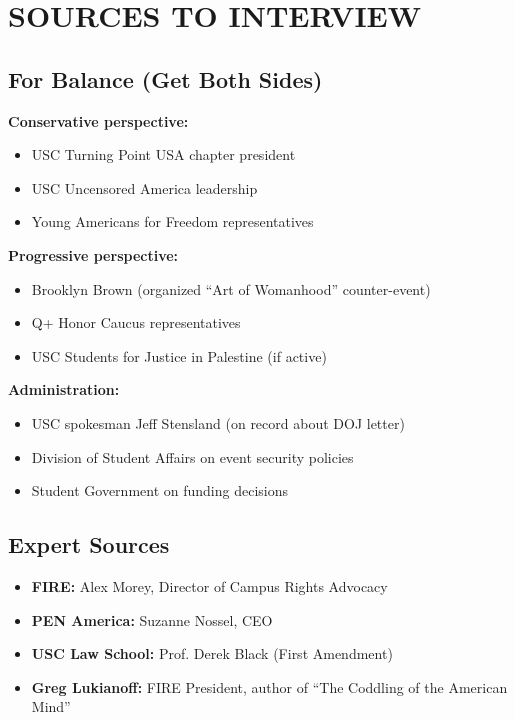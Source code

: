 \documentclass[11pt,letterpaper]{article}
\begin{document}
\section{SOURCES TO INTERVIEW}

\subsection{For Balance (Get Both Sides)}

\textbf{Conservative perspective:}
\begin{itemize}[noitemsep]
    \item USC Turning Point USA chapter president
    \item USC Uncensored America leadership
    \item Young Americans for Freedom representatives
\end{itemize}

\textbf{Progressive perspective:}
\begin{itemize}[noitemsep]
    \item Brooklyn Brown (organized ``Art of Womanhood'' counter-event)
    \item Q+ Honor Caucus representatives
    \item USC Students for Justice in Palestine (if active)
\end{itemize}

\textbf{Administration:}
\begin{itemize}[noitemsep]
    \item USC spokesman Jeff Stensland (on record about DOJ letter)
    \item Division of Student Affairs on event security policies
    \item Student Government on funding decisions
\end{itemize}

\subsection{Expert Sources}

\begin{itemize}[noitemsep]
    \item \textbf{FIRE:} Alex Morey, Director of Campus Rights Advocacy
    \item \textbf{PEN America:} Suzanne Nossel, CEO
    \item \textbf{USC Law School:} Prof. Derek Black (First Amendment)
    \item \textbf{Greg Lukianoff:} FIRE President, author of ``The Coddling of the American Mind''
\end{itemize}
\end{document}
